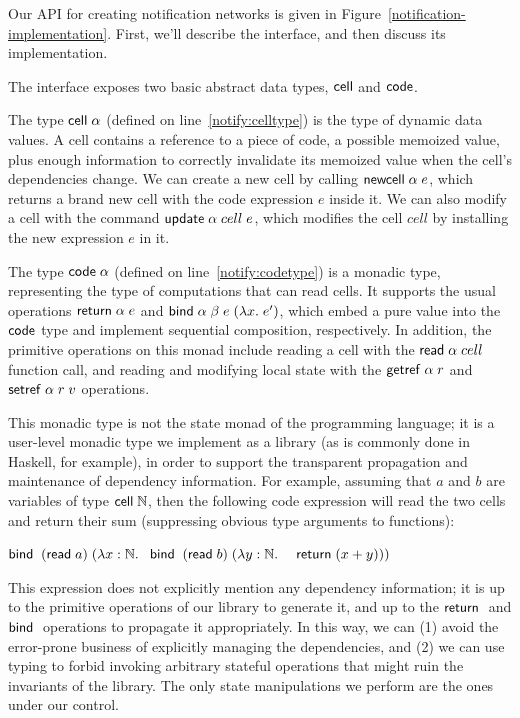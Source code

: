 \documentclass[natbib]{sigplanconf}
\begin{document}
Our API for creating notification networks is given in
Figure~\ref{notification-implementation}. First, we'll describe
the interface, and then discuss its implementation. 

The interface exposes two basic abstract data types, $\mbox{\textsf{{cell}}}$
and $\mbox{\textsf{{code}}}$.

The type $\mbox{\textsf{{cell}}}\;{\alpha}$ (defined on line~\ref{notify:celltype}) is the
type of dynamic data values. A cell contains a reference to a piece of
code, a possible memoized value, plus enough information to correctly
invalidate its memoized value when the cell's dependencies change. We
can create a new cell by calling $\mbox{\textsf{{newcell}}}\; \alpha\; e$, which returns a brand
new cell with the code expression $e$ inside it. We can also modify a
cell with the command $\mbox{\textsf{{update}}}\; \alpha\;cell\;e$, which modifies the
cell $cell$ by installing the new expression $e$ in it.

The type $\mbox{\textsf{{code}}}\;{\alpha}$ (defined on line~\ref{notify:codetype}) is a
monadic type, representing the type of computations that can read
cells. It supports the usual operations $\mbox{\textsf{{return}}}\; \alpha\;e$ and $\mbox{\textsf{{bind}}}\; \alpha\;\beta\;e\;
(\lambda x.\;e')$, which embed a pure value into the $\mbox{\textsf{{code}}}$
type and implement sequential composition, respectively. In addition,
the primitive operations on this monad include reading a cell with the
$\mbox{\textsf{{read}}}\; \alpha\;cell$ function call, and reading and modifying local state
with the $\mbox{\textsf{{getref}}}\; \alpha\;r$ and $\mbox{\textsf{{setref}}}\; \alpha\;r\;v$ operations.

This monadic type is not the state monad of the programming language;
it is a user-level monadic type we implement as a library (as is
commonly done in Haskell, for example), in order to support the
transparent propagation and maintenance of dependency information.
For example, assuming that $a$ and $b$ are variables of type
$\mbox{\textsf{{cell}}}\;{\mathbb{N}}$, then the following code expression will read the two
cells and return their sum (suppressing obvious type arguments to
functions):
\begin{specification}
\nextline  $\mbox{\textsf{{bind}}}\; \;(\mbox{\textsf{{read}}}\; a) \;(\lambda x:\mathbb{N}.\;$ 
\nextline  $\mbox{\textsf{{bind}}}\; \;(\mbox{\textsf{{read}}}\; b) \;(\lambda y:\mathbb{N}.\;$ 
\nextline  $\;\;\mbox{\textsf{{return}}}\;(x+y)))$ 
\end{specification}
This expression does not explicitly mention any dependency
information; it is up to the primitive operations of our library to
generate it, and up to the $\mbox{\textsf{{return}}}\;$ and $\mbox{\textsf{{bind}}}\;$ operations to propagate it
appropriately. In this way, we can (1) avoid the error-prone business
of explicitly managing the dependencies, and (2) we can use typing to
forbid invoking arbitrary stateful operations that might ruin  the
invariants of the library. The only state manipulations we perform are 
the ones under our control. 
 
\end{document}
